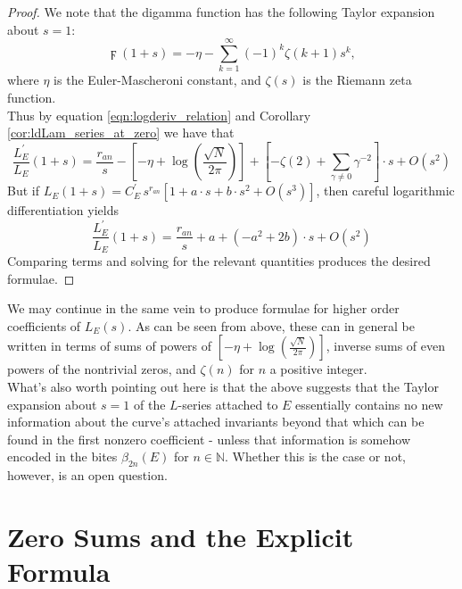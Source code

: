 \documentclass[10pt]{article}
\newcommand{\NN}{\mathbb{N}}
\newcommand{\pr}{^{\prime}}
\newcommand{\ldLe}[1]{\frac{L_E\pr}{L_E}\left(#1\right)}
\begin{document}
\begin{proof}
We note that the digamma function has the following Taylor expansion about $s=1$:
\begin{equation}
\digamma(1+s) = -\eta - \sum_{k=1}^{\infty} (-1)^k \zeta(k+1) s^k,
\end{equation}
where $\eta$ is the Euler-Mascheroni constant, and $\zeta(s)$ is the Riemann zeta function. \\
Thus by equation \ref{eqn:logderiv_relation} and Corollary \ref{cor:ldLam_series_at_zero} we have that
\begin{equation*}
\ldLe{1+s} = \frac{r_{an}}{s} - \left[-\eta + \log\left(\frac{\sqrt{N}}{2\pi}\right)\right] + \left[-\zeta(2) + \sum_{\gamma\ne0} \gamma^{-2}\right]\cdot s + O(s^2)
\end{equation*}
But if $L_E(1+s) = C_E\pr \, s^{r_{an}}\left[1 + a\cdot s + b\cdot s^2 + O(s^3)\right]$, then careful logarithmic differentiation yields
\begin{equation*}
\ldLe{1+s} = \frac{r_{an}}{s} + a + \left(-a^2 + 2b\right)\cdot s + O(s^2)
\end{equation*}
Comparing terms and solving for the relevant quantities produces the desired formulae.
\end{proof}
We may continue in the same vein to produce formulae for higher order coefficients of $L_E(s)$. As can be seen from above, these can in general be written in terms of sums of powers of $\left[-\eta + \log\left(\frac{\sqrt{N}}{2\pi}\right)\right]$, inverse sums of even powers of the nontrivial zeros, and $\zeta(n)$ for $n$ a positive integer. \\

What's also worth pointing out here is that the above suggests that the Taylor expansion about $s=1$ of the $L$-series attached to $E$ essentially contains no new information about the curve's attached invariants beyond that which can be found in the first nonzero coefficient - unless that information is somehow encoded in the bites $\beta_{2n}(E)$ for $n \in \NN$. Whether this is the case or not, however, is an open question.


\newpage
\section{Zero Sums and the Explicit Formula}
\end{document}
